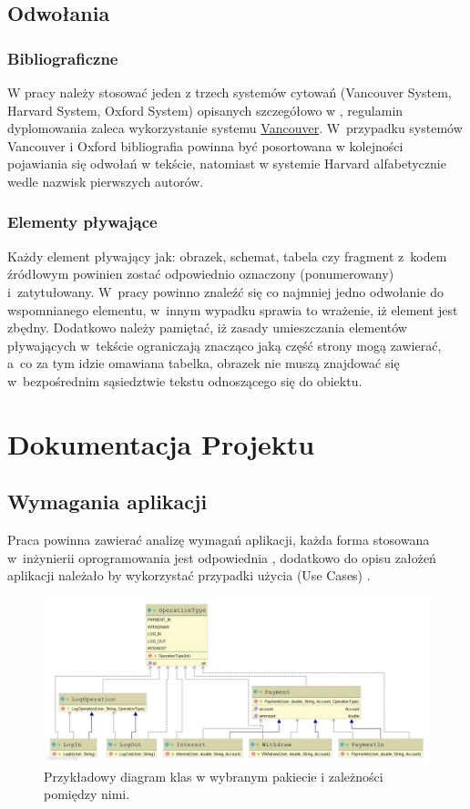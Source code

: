 \documentclass[12pt,a4paper]{article}
\begin{document}
\subsection{Odwołania}

\subsubsection{Bibliograficzne}
W pracy należy stosować jeden z trzech systemów cytowań (Vancouver System, Harvard System, Oxford System) opisanych szczegółowo w \cite{Cytowanie}, regulamin dyplomowania zaleca wykorzystanie systemu \underline{Vancouver}. W~przypadku systemów Vancouver i Oxford bibliografia powinna być posortowana w kolejności pojawiania się odwołań w tekście, natomiast w systemie Harvard alfabetycznie wedle nazwisk pierwszych autorów.

\subsubsection{Elementy pływające}
Każdy element pływający jak: obrazek, schemat, tabela czy fragment z~kodem źródłowym powinien zostać odpowiednio oznaczony (ponumerowany) i~zatytułowany. W~pracy powinno znaleźć się co najmniej jedno odwołanie do wspomnianego elementu, w~innym wypadku sprawia to wrażenie, iż element jest zbędny. Dodatkowo należy pamiętać, iż zasady umieszczania elementów pływających w~tekście ograniczają znacząco jaką część strony mogą zawierać, a~co za tym idzie omawiana tabelka, obrazek nie muszą znajdować się w~bezpośrednim sąsiedztwie tekstu odnoszącego się do obiektu.

\section{Dokumentacja Projektu}\label{dokumentacja}

\subsection{Wymagania aplikacji}
Praca powinna zawierać analizę wymagań aplikacji, każda forma stosowana w~inżynierii oprogramowania jest odpowiednia \cite{IO}, dodatkowo do opisu założeń aplikacji należało by wykorzystać przypadki użycia (Use Cases) \cite{UML}.

\begin{figure}[h]
\centering
\includegraphics[width = \textwidth]{DiagramKlasPakiet.jpg}
\caption{Przykładowy diagram klas w wybranym pakiecie i zależności pomiędzy nimi.}\label{diagram_klas_pakiet}
\end{figure}
\end{document}
